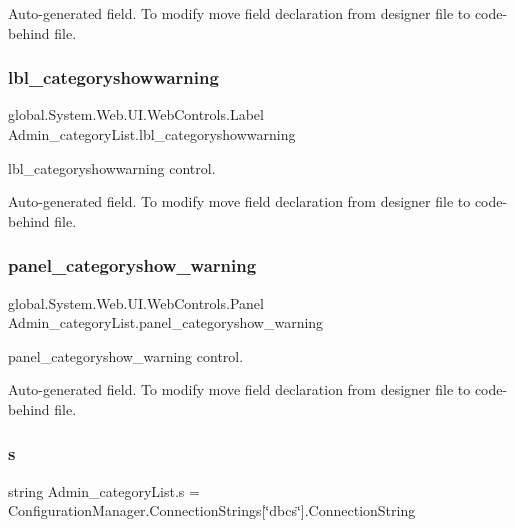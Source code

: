 Auto-\/generated field. To modify move field declaration from designer file to code-\/behind file. \mbox{\label{class_admin__category_list_ad0e8738766fdf3c130e36fd6cd792e68}} 
\subsubsection{\texorpdfstring{lbl\_categoryshowwarning}{lbl\_categoryshowwarning}}
{\footnotesize\ttfamily global.\+System.\+Web.\+U\+I.\+Web\+Controls.\+Label Admin\+\_\+category\+List.\+lbl\+\_\+categoryshowwarning\hspace{0.3cm}{\ttfamily [protected]}}



lbl\+\_\+categoryshowwarning control. 

Auto-\/generated field. To modify move field declaration from designer file to code-\/behind file. \mbox{\label{class_admin__category_list_ab8aa84b5a360efafb723d2b8e960fac4}} 
\subsubsection{\texorpdfstring{panel\_categoryshow\_warning}{panel\_categoryshow\_warning}}
{\footnotesize\ttfamily global.\+System.\+Web.\+U\+I.\+Web\+Controls.\+Panel Admin\+\_\+category\+List.\+panel\+\_\+categoryshow\+\_\+warning\hspace{0.3cm}{\ttfamily [protected]}}



panel\+\_\+categoryshow\+\_\+warning control. 

Auto-\/generated field. To modify move field declaration from designer file to code-\/behind file. \mbox{\label{class_admin__category_list_a0b85585d2b612ad7bf920ee63b0faecd}} 
\subsubsection{\texorpdfstring{s}{s}}
{\footnotesize\ttfamily string Admin\+\_\+category\+List.\+s = Configuration\+Manager.\+Connection\+Strings\mbox{[}\char`\"{}dbcs\char`\"{}\mbox{]}.Connection\+String\hspace{0.3cm}{\ttfamily [private]}}




